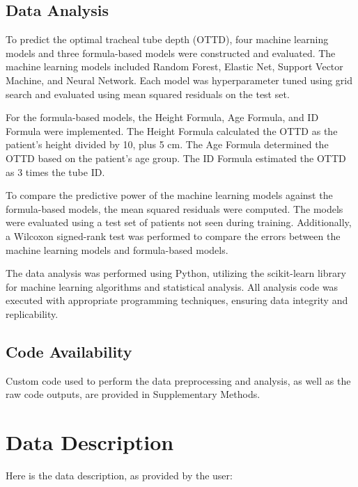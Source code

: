 \documentclass[11pt]{article}
\begin{document}
\subsection*{Data Analysis}
To predict the optimal tracheal tube depth (OTTD), four machine learning models and three formula-based models were constructed and evaluated. The machine learning models included Random Forest, Elastic Net, Support Vector Machine, and Neural Network. Each model was hyperparameter tuned using grid search and evaluated using mean squared residuals on the test set.

For the formula-based models, the Height Formula, Age Formula, and ID Formula were implemented. The Height Formula calculated the OTTD as the patient's height divided by 10, plus 5 cm. The Age Formula determined the OTTD based on the patient's age group. The ID Formula estimated the OTTD as 3 times the tube ID.

To compare the predictive power of the machine learning models against the formula-based models, the mean squared residuals were computed. The models were evaluated using a test set of patients not seen during training. Additionally, a Wilcoxon signed-rank test was performed to compare the errors between the machine learning models and formula-based models.

The data analysis was performed using Python, utilizing the scikit-learn library for machine learning algorithms and statistical analysis. All analysis code was executed with appropriate programming techniques, ensuring data integrity and replicability.\subsection*{Code Availability}

Custom code used to perform the data preprocessing and analysis, as well as the raw code outputs, are provided in Supplementary Methods.


\clearpage
\appendix

\section{Data Description} \label{sec:data_description} Here is the data description, as provided by the user:
\end{document}
